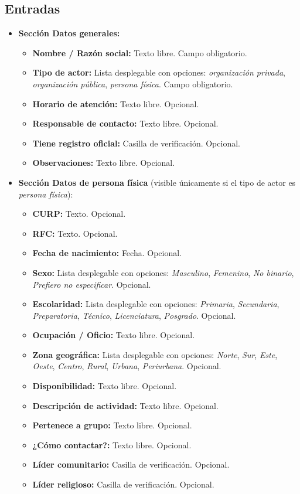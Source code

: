 \subsection{Entradas}
\begin{itemize}
	\item \textbf{Sección Datos generales:}
	\begin{itemize}
		\item \textbf{Nombre / Razón social:} Texto libre. Campo obligatorio.
		\item \textbf{Tipo de actor:} Lista desplegable con opciones: 
		\textit{organización privada}, \textit{organización pública}, 
		\textit{persona física}. Campo obligatorio.
		\item \textbf{Horario de atención:} Texto libre. Opcional.
		\item \textbf{Responsable de contacto:} Texto libre. Opcional.
		\item \textbf{Tiene registro oficial:} Casilla de verificación. Opcional.
		\item \textbf{Observaciones:} Texto libre. Opcional.
	\end{itemize}
	\item \textbf{Sección Datos de persona física} (visible únicamente si el tipo 
	de actor es \textit{persona física}):
	\begin{itemize}
		\item \textbf{CURP:} Texto. Opcional.
		\item \textbf{RFC:} Texto. Opcional.
		\item \textbf{Fecha de nacimiento:} Fecha. Opcional.
		\item \textbf{Sexo:} Lista desplegable con opciones: \textit{Masculino}, 
		\textit{Femenino}, \textit{No binario}, \textit{Prefiero no especificar}. 
		Opcional.
		\item \textbf{Escolaridad:} Lista desplegable con opciones: 
		\textit{Primaria}, \textit{Secundaria}, \textit{Preparatoria}, 
		\textit{Técnico}, \textit{Licenciatura}, \textit{Posgrado}. Opcional.
		\item \textbf{Ocupación / Oficio:} Texto libre. Opcional.
		\item \textbf{Zona geográfica:} Lista desplegable con opciones: 
		\textit{Norte}, \textit{Sur}, \textit{Este}, \textit{Oeste}, 
		\textit{Centro}, \textit{Rural}, \textit{Urbana}, \textit{Periurbana}. 
		Opcional.
		\item \textbf{Disponibilidad:} Texto libre. Opcional.
		\item \textbf{Descripción de actividad:} Texto libre. Opcional.
		\item \textbf{Pertenece a grupo:} Texto libre. Opcional.
		\item \textbf{¿Cómo contactar?:} Texto libre. Opcional.
		\item \textbf{Líder comunitario:} Casilla de verificación. Opcional.
		\item \textbf{Líder religioso:} Casilla de verificación. Opcional.
	\end{itemize}
\end{itemize}
